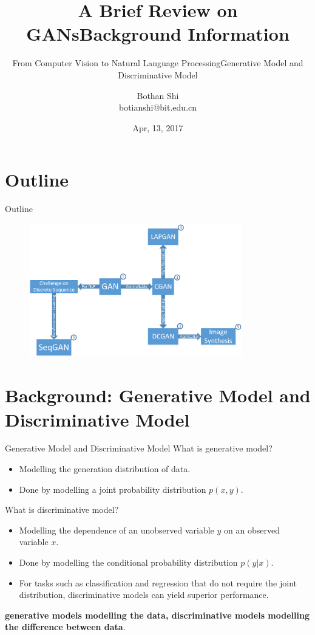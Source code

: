 \documentclass[10pt]{beamer}
\newcommand{\subtitlepage}[3]{\title{#1}\subtitle{#2}\author{#3}\date{}\begin{frame}[plain]\titlepage\end{frame}}
\begin{document}
	
	\title{A Brief Review on GANs}
	\subtitle{From Computer Vision to Natural Language Processing}
	\author{Bothan Shi \\ botianshi@bit.edu.cn}
	\date{Apr, 13, 2017}
	
	
	\begin{frame}[plain]
		\titlepage
	\end{frame}

	\part{Outline}
	\begin{frame}{Outline}
		\begin{figure}
			\includegraphics[width=25em]{figures/outline.png}
		\end{figure}
	\end{frame}

	\part{Background: Generative Model and Discriminative Model}
	\subtitlepage{Background Information}{Generative Model and Discriminative Model}{}
	\begin{frame}{Generative Model and Discriminative Model}
		What is generative model?
		\begin{itemize}
			\pause
			\item Modelling the generation distribution of data.
			\pause
			\item Done by modelling a joint probability distribution $p(x, y)$.
		\end{itemize}
		\pause
		What is discriminative model?
		\begin{itemize}
			\pause
			\item Modelling the dependence of an unobserved variable $y$ on an observed variable $x$.
			\pause
			\item Done by modelling the conditional probability distribution $p(y|x)$.
			\pause
			\item For tasks such as classification and regression that do not require the joint distribution, discriminative models can yield superior performance.
		\end{itemize}
		\pause
		\textbf{generative models modelling the data, discriminative models modelling the difference between data}.
	\end{frame}
\end{document}

